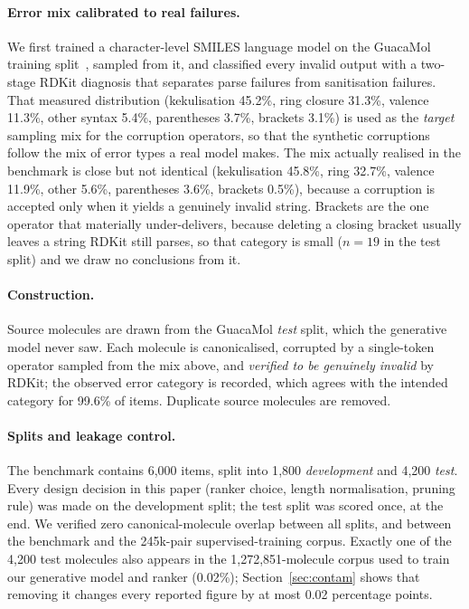 \documentclass[journal=jcisd8,manuscript=article]{achemso}
\begin{document}
\paragraph{Error mix calibrated to real failures.}
We first trained a character-level SMILES language model on the GuacaMol
training split~\citep{brown2019guacamol}, sampled from it, and classified every
invalid output with a two-stage RDKit diagnosis that separates parse failures
from sanitisation failures. That measured distribution (kekulisation 45.2\%,
ring closure 31.3\%, valence 11.3\%, other syntax 5.4\%, parentheses 3.7\%,
brackets 3.1\%) is used as the \emph{target} sampling mix for the corruption
operators, so that the synthetic corruptions follow the mix of error types a real
model makes. The mix actually realised in the benchmark is close but not identical
(kekulisation 45.8\%, ring 32.7\%, valence 11.9\%, other 5.6\%, parentheses
3.6\%, brackets 0.5\%), because a corruption is accepted only when it yields a
genuinely invalid string. Brackets are the one operator that materially
under-delivers, because deleting a closing bracket usually leaves a string
RDKit still parses, so that category is small ($n=19$ in the test split) and we
draw no conclusions from it.

\paragraph{Construction.}
Source molecules are drawn from the GuacaMol \emph{test} split, which the
generative model never saw. Each molecule is canonicalised, corrupted by a
single-token operator sampled from the mix above, and \emph{verified to be
genuinely invalid} by RDKit; the observed error category is recorded, which
agrees with the intended category for 99.6\% of items. Duplicate source
molecules are removed.

\paragraph{Splits and leakage control.}
The benchmark contains 6{,}000 items, split into 1{,}800 \emph{development} and
4{,}200 \emph{test}. Every design decision in this paper (ranker choice,
length normalisation, pruning rule) was made on the development split; the
test split was scored once, at the end. We verified zero canonical-molecule
overlap between all splits, and between the benchmark and the 245k-pair
supervised-training corpus. Exactly one of the 4{,}200 test molecules also
appears in the 1{,}272{,}851-molecule corpus used to train our generative model
and ranker (0.02\%); Section~\ref{sec:contam} shows that removing it changes
every reported figure by at most 0.02 percentage points.
\end{document}
